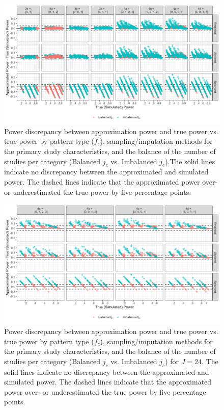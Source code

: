 \begin{figure}
    \centering
    \vspace{-5pt}\includegraphics[width=\linewidth]{chapters/plots/fc_bal_allsamp_rejrate.png}\caption{Power discrepancy between approximation power and true power vs. true power by pattern type ($f_c$), sampling/imputation methods for the primary study characteristics, and the balance of the number of studies per category (Balanced $j_c$ vs. Imbalanced $j_c$).The solid lines indicate no discrepancy between the approximated and simulated power. The dashed lines indicate that the approximated power over- or underestimated the true power by five percentage points.\label{fig: fc_bal_allsamp_rejrate}}
    \vspace{-5pt}
\end{figure}

\begin{figure}
    \centering
    \vspace{-5pt}\includegraphics[width=\linewidth]{chapters/plots/fc_bal_allsamp_rejrate_J24.png}\caption{Power discrepancy between approximation power and true power vs. true power by pattern type ($f_c$), sampling/imputation methods for the primary study characteristics, and the balance of the number of studies per category (Balanced $j_c$ vs. Imbalanced $j_c$) for $J = 24$. The solid lines indicate no discrepancy between the approximated and simulated power. The dashed lines indicate that the approximated power over- or underestimated the true power by five percentage points. \label{fig: fc_bal_allsamp_rejrate_J24}}
    \vspace{-5pt}
\end{figure}



